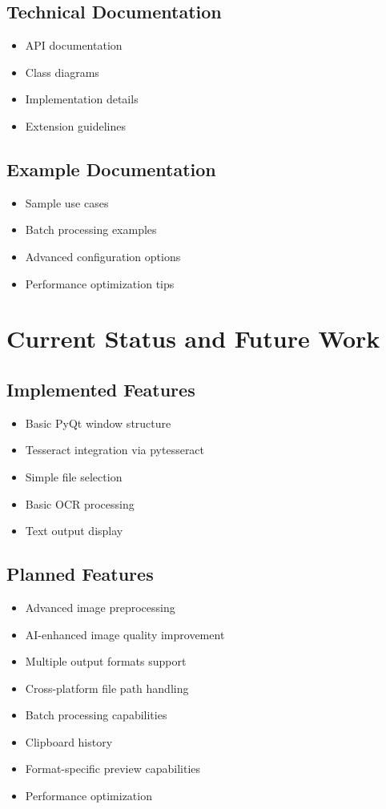 \documentclass[12pt]{article}
\begin{document}
\subsection{Technical Documentation}
\begin{itemize}
    \item API documentation
    \item Class diagrams
    \item Implementation details
    \item Extension guidelines
\end{itemize}

\subsection{Example Documentation}
\begin{itemize}
    \item Sample use cases
    \item Batch processing examples
    \item Advanced configuration options
    \item Performance optimization tips
\end{itemize}

\section{Current Status and Future Work}

\subsection{Implemented Features}
\begin{itemize}
    \item Basic PyQt window structure
    \item Tesseract integration via pytesseract
    \item Simple file selection
    \item Basic OCR processing
    \item Text output display
\end{itemize}

\subsection{Planned Features}
\begin{itemize}
    \item Advanced image preprocessing
    \item AI-enhanced image quality improvement
    \item Multiple output formats support
    \item Cross-platform file path handling
    \item Batch processing capabilities
    \item Clipboard history
    \item Format-specific preview capabilities
    \item Performance optimization
\end{itemize}
\end{document}

